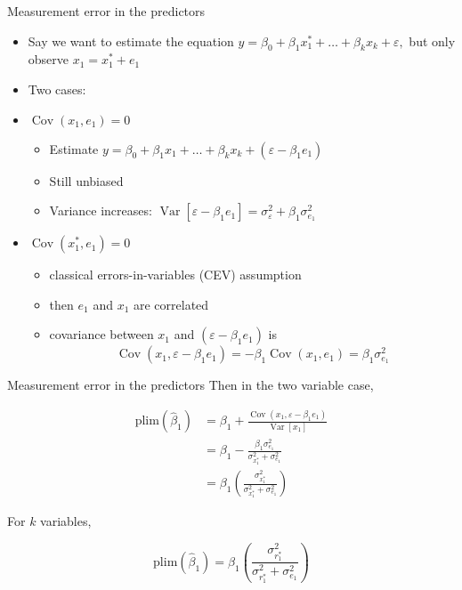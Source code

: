 \documentclass[
  ignorenonframetext,
]{beamer}
\providecommand{\tightlist}{%
  \setlength{\itemsep}{0pt}\setlength{\parskip}{0pt}}
\newcommand{\setsep}{\setlength{\itemsep}{3pt}}
\newcommand{\setskip}{\setlength{\parskip}{3pt}}
\renewcommand{\tightlist}{\setsep\setskip}
\begin{document}
\begin{frame}{Measurement error in the predictors}
\protect\hypertarget{measurement-error-in-the-predictors}{}
\pause

\begin{itemize}[<+->]
\tightlist
\item
  Say we want to estimate the equation \(y = \beta_0 + \beta_1 x_1^\ast + \dots + \beta_k x_k + \varepsilon,\) but only observe \(x_1 = x_1^\ast + e_1\)
\item
  Two cases:
\item
  \(\mathop{\mathrm{Cov}}\left(x_1, e_1\right) = 0\)

  \begin{itemize}[<+->]
  \tightlist
  \item
    Estimate \(y = \beta_0 + \beta_1 x_1 + \dots + \beta_k x_k + \left(\varepsilon - \beta_1 e_1\right)\)
  \item
    Still unbiased
  \item
    Variance increases: \(\ensuremath{\mathop{\mathrm{Var}}\left[\varepsilon - \beta_1 e_1\right]} = \sigma_\varepsilon^2 + \beta_1 \sigma_{e_1}^2\)
  \end{itemize}
\item
  \(\mathop{\mathrm{Cov}}\left(x_1^\ast, e_1\right) = 0\)

  \begin{itemize}[<+->]
  \tightlist
  \item
    classical errors-in-variables (CEV) assumption
  \item
    then \(e_1\) and \(x_1\) are correlated
  \item
    covariance between \(x_1\) and \(\left(\varepsilon - \beta_1 e_1\right)\) is
    \[ \mathop{\mathrm{Cov}}\left(x_1, \varepsilon - \beta_1 e_1\right) = -\beta_1 \mathop{\mathrm{Cov}}\left(x_1, e_1\right) = \beta_1\sigma_{e_1}^2\]
  \end{itemize}
\end{itemize}
\end{frame}

\begin{frame}{Measurement error in the predictors}
\protect\hypertarget{measurement-error-in-the-predictors-1}{}
Then in the two variable case,

\begin{align*}
\text{plim}\left(\hat{\beta}_1\right)
& = \beta_1 + \frac{\mathop{\mathrm{Cov}}\left(x_1, \varepsilon - \beta_1 e_1\right)}{\ensuremath{\mathop{\mathrm{Var}}\left[x_1\right]}} \\
& = \beta_1 - \frac{\beta_1\sigma_{e_1}^2}{\sigma_{x_1^\ast}^2 + \sigma_{e_1}^2} \\
& = \beta_1 \left( \frac{\sigma_{x_1^\ast}^2}{\sigma_{x_1^\ast}^2 + \sigma_{e_1}^2} \right)
\end{align*}

\pause

For \(k\) variables,

\[
\text{plim}\left(\hat{\beta}_1\right)
=
\beta_1 \left( \frac{\sigma_{r_1^\ast}^2}{\sigma_{r_1^\ast}^2 + \sigma_{e_1}^2} \right)
\]
\end{frame}
\end{document}

